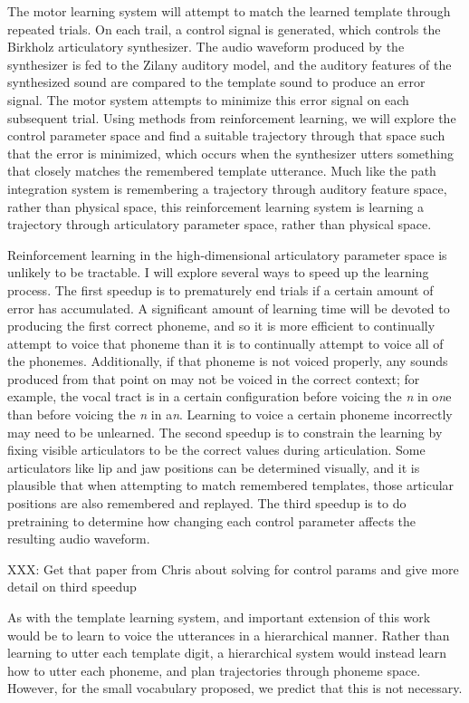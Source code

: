 \documentclass{article}
\begin{document}
The motor learning system will
attempt to match the learned template
through repeated trials.
On each trail,
a control signal is generated,
which controls the Birkholz
articulatory synthesizer.
The audio waveform produced
by the synthesizer is fed
to the Zilany auditory model,
and the auditory features
of the synthesized sound
are compared to the template sound
to produce an error signal.
The motor system attempts
to minimize this error signal
on each subsequent trial.
Using methods from
reinforcement learning,
we will explore the control parameter space
and find a suitable trajectory
through that space
such that the error is minimized,
which occurs when the synthesizer
utters something that closely matches
the remembered template utterance.
Much like the path integration system
is remembering a trajectory through
auditory feature space,
rather than physical space,
this reinforcement learning system
is learning a trajectory through
articulatory parameter space,
rather than physical space.

Reinforcement learning in the high-dimensional
articulatory parameter space
is unlikely to be tractable.
I will explore several ways to speed up
the learning process.
The first speedup is to prematurely end trials
if a certain amount of error has accumulated.
A significant amount of learning time will
be devoted to producing the first correct phoneme,
and so it is more efficient to continually
attempt to voice that phoneme
than it is to continually attempt to voice
all of the phonemes.
Additionally, if that phoneme is not voiced properly,
any sounds produced from that point on
may not be voiced in the correct context;
for example, the vocal tract is in a certain
configuration before voicing the \textit{n}
in o\textit{n}e than before
voicing the \textit{n} in a\textit{n}.
Learning to voice a certain phoneme incorrectly
may need to be unlearned.
The second speedup is to constrain the learning
by fixing visible articulators to be
the correct values during articulation.
Some articulators like lip and jaw positions
can be determined visually,
and it is plausible that when attempting
to match remembered templates,
those articular positions are also
remembered and replayed.
The third speedup is to
do pretraining to determine
how changing each control parameter
affects the resulting audio waveform.

XXX: Get that paper from Chris about solving for control params
and give more detail on third speedup

As with the template learning system,
and important extension of this work
would be to learn to voice
the utterances in a hierarchical manner.
Rather than learning
to utter each template digit,
a hierarchical system would instead
learn how to utter each phoneme,
and plan trajectories through phoneme space.
However, for the small vocabulary proposed,
we predict that this is not necessary.
\end{document}

